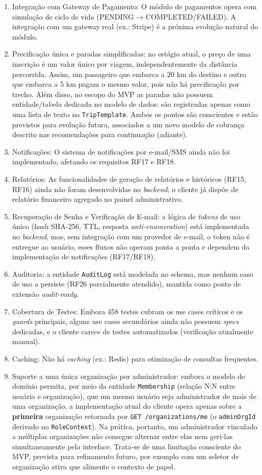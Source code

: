 \documentclass[12pt,openright,oneside,a4paper]{article}
\begin{document}
\begin{enumerate}
\item Integração com Gateway de Pagamento: O módulo de pagamentos opera com simulação de ciclo de vida (PENDING → COMPLETED/FAILED). A integração com um gateway real (ex.: Stripe) é a próxima evolução natural do módulo.
\item Precificação única e paradas simplificadas: no estágio atual, o preço de uma inscrição é um valor único por viagem, independentemente da distância percorrida. Assim, um passageiro que embarca a 20 km do destino e outro que embarca a 5 km pagam o mesmo valor, pois não há precificação por trecho. Além disso, no escopo do MVP as paradas não possuem entidade/tabela dedicada no modelo de dados: são registradas apenas como uma lista de texto no \texttt{TripTemplate}. Ambos os pontos são conscientes e estão previstos para evolução futura, associados a um novo modelo de cobrança descrito nas recomendações para continuação (adiante).
\item Notificações: O sistema de notificações por e-mail/SMS ainda não foi implementado, afetando os requisitos RF17 e RF18.
\item Relatórios: As funcionalidades de geração de relatórios e históricos (RF15, RF16) ainda não foram desenvolvidas no \textit{backend}; o cliente já dispõe de relatório financeiro agregado no painel administrativo.
\item Recuperação de Senha e Verificação de E-mail: a lógica de \textit{tokens} de uso único (hash SHA-256, TTL, resposta \textit{anti-enumeration}) está implementada no \textit{backend}, mas, sem integração com um provedor de e-mail, o token não é entregue ao usuário, esses fluxos não operam ponta a ponta e dependem da implementação de notificações (RF17/RF18).
\item Auditoria: a entidade \texttt{AuditLog} está modelada no schema, mas nenhum caso de uso a persiste (RF26 parcialmente atendido), mantida como ponto de extensão \textit{audit-ready}.
\item Cobertura de Testes: Embora 458 testes cubram os use cases críticos e os \textit{guards} principais, alguns use cases secundários ainda não possuem \textit{specs} dedicadas, e o cliente carece de testes automatizados (verificação atualmente manual).
\item Caching: Não há \textit{caching} (ex.: Redis) para otimização de consultas frequentes.
\item Suporte a uma única organização por administrador: embora o modelo de domínio permita, por meio da entidade \texttt{Membership} (relação N:N entre usuário e organização), que um mesmo usuário seja administrador de mais de uma organização, a implementação atual do cliente opera apenas sobre a \textbf{primeira} organização retornada por \texttt{GET /organizations/me} (o \texttt{adminOrgId} derivado no \texttt{RoleContext}). Na prática, portanto, um administrador vinculado a múltiplas organizações não consegue alternar entre elas nem geri-las simultaneamente pela interface. Trata-se de uma limitação consciente do MVP, prevista para refinamento futuro, por exemplo com um seletor de organização ativa que alimente o contexto de papel.

\end{enumerate}
\end{document}
